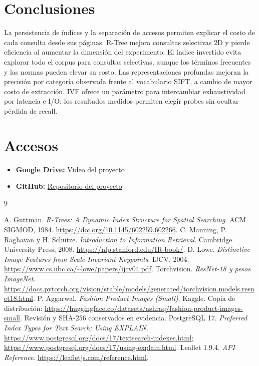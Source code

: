 \documentclass[11pt,a4paper]{article}
\begin{document}
\section{Conclusiones}
La persistencia de índices y la separación de accesos permiten explicar el costo de cada consulta desde sus páginas. R-Tree mejora consultas selectivas 2D y pierde eficiencia al aumentar la dimensión del experimento. El índice invertido evita explorar todo el corpus para consultas selectivas, aunque los términos frecuentes y las normas pueden elevar su costo. Las representaciones profundas mejoran la precisión por categoría observada frente al vocabulario SIFT, a cambio de mayor costo de extracción. IVF ofrece un parámetro para intercambiar exhaustividad por latencia e I/O; los resultados medidos permiten elegir probes sin ocultar pérdida de recall.

\section{Accesos}

\begin{itemize}
    \item \textbf{Google Drive:} 
    \href{https://drive.google.com/drive/folders/1Xy8X1cCnyQmgPVzX9DP6mqPLBD_IGUpa?usp=sharing}{Video del proyecto}

    \item \textbf{GitHub:} 
    \href{https://github.com/ArmandoPal/BD2_proyecto}{Repositorio del proyecto}
\end{itemize}

\begin{thebibliography}{9}
\raggedright
{} A. Guttman. \emph{R-Trees: A Dynamic Index Structure for Spatial Searching}. ACM SIGMOD, 1984. \url{https://doi.org/10.1145/602259.602266}.
 C. Manning, P. Raghavan y H. Schütze. \emph{Introduction to Information Retrieval}. Cambridge University Press, 2008. \url{https://nlp.stanford.edu/IR-book/}.
 D. Lowe. \emph{Distinctive Image Features from Scale-Invariant Keypoints}. IJCV, 2004. \url{https://www.cs.ubc.ca/~lowe/papers/ijcv04.pdf}.
 Torchvision. \emph{ResNet-18 y pesos ImageNet}. \url{https://docs.pytorch.org/vision/stable/models/generated/torchvision.models.resnet18.html}.
 P. Aggarwal. \emph{Fashion Product Images (Small)}. Kaggle. Copia de distribución: \url{https://huggingface.co/datasets/ashraq/fashion-product-images-small}. Revisión y SHA-256 conservados en evidencia.
 PostgreSQL 17. \emph{Preferred Index Types for Text Search; Using EXPLAIN}. \url{https://www.postgresql.org/docs/17/textsearch-indexes.html}; \url{https://www.postgresql.org/docs/17/using-explain.html}.
 Leaflet 1.9.4. \emph{API Reference}. \url{https://leafletjs.com/reference.html}.
\end{thebibliography}
\end{document}
